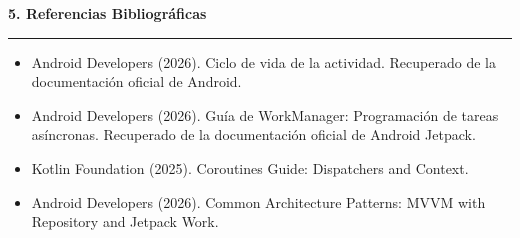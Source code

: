 \documentclass[10pt,letterpaper]{article}
\newcommand{\ruledheading}[1]{\par\vspace{0.2em}
\noindent\textbf{#1}\par
\noindent\rule{\linewidth}{0.45pt}\par}
\begin{document}
\ruledheading{5. Referencias Bibliográficas}
\begin{itemize}
  \item Android Developers (2026). Ciclo de vida de la actividad. Recuperado de la documentación oficial de Android.
  \item Android Developers (2026). Guía de WorkManager: Programación de tareas asíncronas. Recuperado de la documentación oficial de Android Jetpack.
  \item Kotlin Foundation (2025). Coroutines Guide: Dispatchers and Context.
  \item Android Developers (2026). Common Architecture Patterns: MVVM with Repository and Jetpack Work.
\end{itemize}
\end{document}
